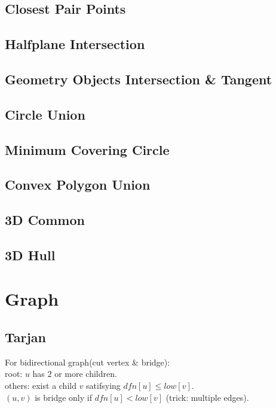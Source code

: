 ﻿\documentclass[10pt]{article}
\begin{document}
{\subsection{Closest Pair Points}

\subsection{Halfplane Intersection}


\subsection{Geometry Objects Intersection \& Tangent}



\subsection{Circle Union}

\subsection{Minimum Covering Circle}

\subsection{Convex Polygon Union}

\subsection{3D Common}

\subsection{3D Hull}

\section{Graph}
\subsection{Tarjan}

For bidirectional graph(cut vertex \& bridge): \\
root: $u$ has $2$ or more children. \\
others: exist a child $v$ satifsying $dfn[u] \le low[v]$. \\
$(u, v)$ is bridge only if $dfn[u] < low[v]$ (trick: multiple edges).\\
}
\end{document}
